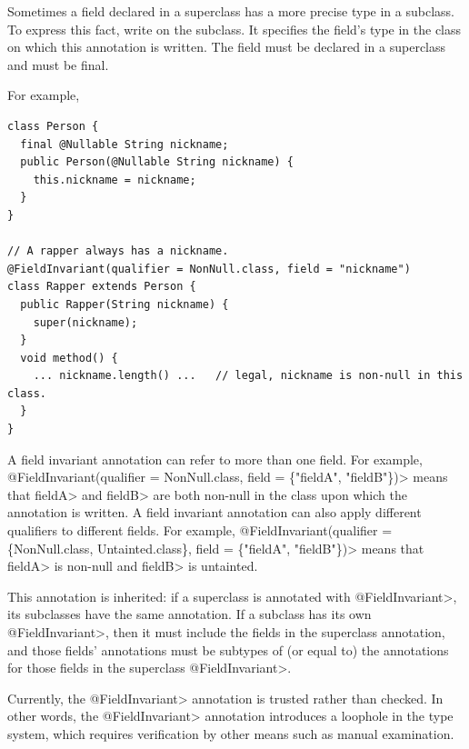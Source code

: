 Sometimes a field declared in a superclass has a more precise type in a
subclass.  To express this fact, write
 on the subclass. It specifies
the field's type in the class on which this annotation is written.
The field must be declared in a superclass and
must be final.


For example,
\begin{Verbatim}
class Person {
  final @Nullable String nickname;
  public Person(@Nullable String nickname) {
    this.nickname = nickname;
  }
}

// A rapper always has a nickname.
@FieldInvariant(qualifier = NonNull.class, field = "nickname")
class Rapper extends Person {
  public Rapper(String nickname) {
    super(nickname);
  }
  void method() {
    ... nickname.length() ...   // legal, nickname is non-null in this class.
  }
}
\end{Verbatim}
 A field invariant annotation can refer to more than one field. For example,
\<@FieldInvariant(qualifier = NonNull.class, field = \{"fieldA", "fieldB"\})> means
that \<fieldA> and \<fieldB> are both non-null in the class upon which the
annotation is written.  A field invariant annotation
can also apply different qualifiers to different fields. For example,
\<@FieldInvariant(qualifier = \{NonNull.class, Untainted.class\}, field =
\{"fieldA", "fieldB"\})> means that \<fieldA> is non-null and \<fieldB> is untainted.

This annotation is inherited:  if a superclass is annotated with
\<@FieldInvariant>, its subclasses have the same annotation. If a subclass has its
own \<@FieldInvariant>, then it must include the fields in the superclass
annotation, and those fields' annotations must be subtypes of (or equal to) the
annotations for those fields in the superclass \<@FieldInvariant>.

Currently, the \<@FieldInvariant> annotation is trusted rather than
checked.  In other words, the \<@FieldInvariant> annotation introduces a
loophole in the type system, which requires verification by other means
such as manual examination.


